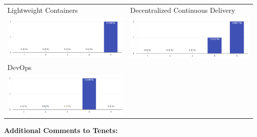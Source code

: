 \begin{center}
\begin{tabular}{ p{8.7cm} p{8.7cm} }
		Lightweight Containers &
		Decentralized Continuous Delivery\\
		\includegraphics[width=\linewidth]{images/survey/tenet5}
    	&
    	\includegraphics[width=\linewidth]{images/survey/tenet6}\\[.7cm]
		
		DevOps & \\
		\includegraphics[width=\linewidth]{images/survey/tenet7}
    	& \\
    \end{tabular}
\end{center}

\textbf{Additional Comments to \msuc{} Tenets:}

